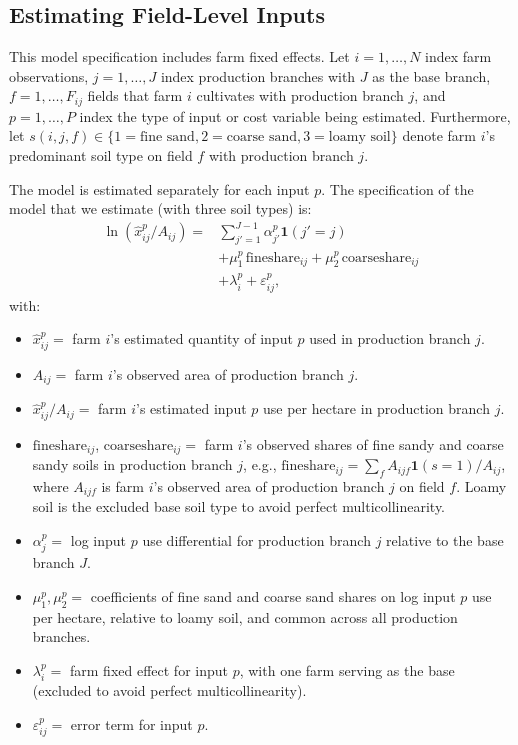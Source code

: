 \documentclass[12pt]{article}
\begin{document}
\subsection{Estimating Field-Level Inputs}
\label{sec:input-model}
This model specification includes farm fixed effects.
Let $i = 1, \ldots, N$ index farm observations, $j = 1, \ldots, J$ index production branches with $J$ as the base branch, $f = 1, \ldots, F_{ij}$ fields that farm $i$ cultivates with production branch $j$, and $p = 1, \ldots, P$ index the type of input or cost variable being estimated. Furthermore, let $s(i,j,f) \in \{1 = \text{fine sand}, 2 = \text{coarse sand}, 3 = \text{loamy soil}\}$ denote farm $i$'s predominant soil type on field $f$ with production branch $j$.

The model is estimated separately for each input $p$.
The specification of the model that we estimate (with three soil types) is:
\begin{equation}
\begin{aligned}
    \ln(\hat{x}_{ij}^p / A_{ij}) = & \sum_{j'=1}^{J-1} \alpha_{j'}^p \mathbf{1}(j'=j) \\
    &+ \mu_1^p\,\text{fineshare}_{ij}
    + \mu_2^p\,\text{coarseshare}_{ij} \\
    &+ \lambda_i^p + \varepsilon_{ij}^p,
    \label{eq:model-spec-inputs}
\end{aligned}
\end{equation}
with:
\begin{itemize}
    \item $\hat{x}_{ij}^p =$ farm $i$'s estimated quantity of input $p$ used in production branch $j$.
    \item $A_{ij} =$ farm $i$'s observed area of production branch $j$.
    \item $\hat{x}_{ij}^p / A_{ij} =$ farm $i$'s estimated input $p$ use per hectare in production branch $j$.
    \item $\text{fineshare}_{ij}$, $\text{coarseshare}_{ij} =$ farm $i$'s observed shares of fine sandy and coarse sandy soils in production branch $j$, e.g., $\text{fineshare}_{ij} = \sum_f A_{ijf} \mathbf{1}(s = 1) / A_{ij}$, where $A_{ijf}$ is farm $i$'s observed area of production branch $j$ on field $f$. Loamy soil is the excluded base soil type to avoid perfect multicollinearity.
    \item $\alpha_{j}^p =$ log input $p$ use differential for production branch $j$ relative to the base branch $J$.
    \item $\mu_1^p, \mu_2^p =$ coefficients of fine sand and coarse sand shares on log input $p$ use per hectare, relative to loamy soil, and common across all production branches.
    \item $\lambda_i^p =$ farm fixed effect for input $p$, with one farm serving as the base (excluded to avoid perfect multicollinearity).
    \item $\varepsilon_{ij}^p =$ error term for input $p$.
\end{itemize}
\end{document}
